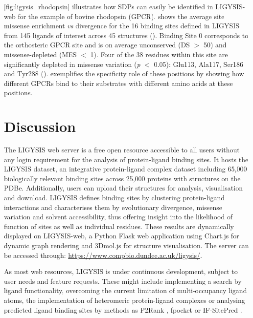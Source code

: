 \autoref{fig:ligysis_rhodopsin} illustrates how SDPs can easily be identified in LIGYSIS-web for the example of bovine rhodopsin (GPCR).  shows the average site missense enrichment \textit{vs} divergence for the 16 binding sites defined in LIGYSIS from 145 ligands of interest across 45 structures (). Binding Site 0 corresponds to the orthosteric GPCR site and is on average unconserved (DS $>$ 50) and missense-depleted (MES $<$ 1). Four of the 38 residues within this site are significantly depleted in missense variation (\textit{p} $<$ 0.05): Glu113, Ala117, Ser186 and Tyr288 ().  exemplifies the specificity role of these positions by showing how different GPCRs bind to their substrates with different amino acids at these positions.

\section{Discussion}

The LIGYSIS web server is a free open resource accessible to all users without any login requirement for the analysis of protein-ligand binding sites. It hosts the LIGYSIS dataset, an integrative protein-ligand complex dataset including 65,000 biologically relevant binding sites across 25,000 proteins with structures on the PDBe. Additionally, users can upload their structures for analysis, visualisation and download. LIGYSIS defines binding sites by clustering protein-ligand interactions and characterises them by evolutionary divergence, missense variation and solvent accessibility, thus offering insight into the likelihood of function of sites as well as individual residues. These results are dynamically displayed on LIGYSIS-web, a Python Flask web application using Chart.js for dynamic graph rendering and 3Dmol.js for structure visualisation. The server can be accessed through: \url{https://www.compbio.dundee.ac.uk/ligysis/}.

As most web resources, LIGYSIS is under continuous development, subject to user needs and feature requests. These might include implementing a search by ligand functionality, overcoming the current limitation of multi-occupancy ligand atoms, the implementation of heteromeric protein-ligand complexes or analysing predicted ligand binding sites by methods as P2Rank \cite{KRIVAK_2018_P2RANK}, fpocket \cite{GUILLOUX_2009_FPOCKET} or IF-SitePred \cite{CARBERY_2024_IFSP}.
